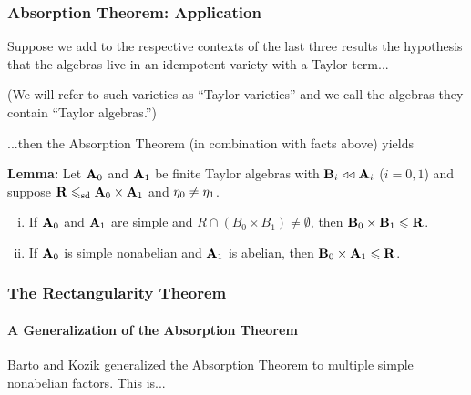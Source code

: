 \documentclass[9pt,xcolor=dvipsnames%
   ]{beamer}
\begin{document}
\begin{frame} \frametitle{Absorption Theorem: Application}
  Suppose we add to the respective contexts of the last three results the hypothesis
  that the algebras live in an idempotent variety with a Taylor term...

  \bigskip  
  (We will refer to such varieties as ``Taylor varieties'' and we call the
  algebras they contain ``Taylor algebras.'')

  \bigskip  
  ...then the Absorption Theorem (in combination with facts above) yields

  \bigskip  
  {\bf Lemma:}
  Let $\mathbf{A}_0$ and $\mathbf{A}_1$ be finite Taylor algebras
  with $\mathbf{B}_i\mathrel{\triangleleft\triangleleft} \mathbf{A}_i$ ($i =0,1$)
  and suppose $\mathbf{R} \leqslant_{\mathrm{sd}} \mathbf{A}_0 \times \mathbf{A}_1$ and $\eta_0 \neq \eta_1$.
    \begin{enumerate}[(i)]
    \item If $\mathbf{A}_0$ and $\mathbf{A}_1$ are simple and $R\cap (B_0 \times B_1) \neq \emptyset$, then
      $\mathbf{B}_0 \times \mathbf{B}_1\leqslant \mathbf{R}$. 
    \item  If $\mathbf{A}_0$ is simple nonabelian and $\mathbf{A}_1$ is abelian,
      then $\mathbf{B}_0 \times \mathbf{A}_1 \leqslant \mathbf{R}$.
    \end{enumerate}

    \bigskip

    \bigskip

    \bigskip
    
\end{frame}


\begin{frame} \frametitle{The Rectangularity Theorem}
  \framesubtitle{A Generalization of the Absorption Theorem}

  Barto and Kozik generalized the Absorption Theorem
  to multiple simple nonabelian factors. This is...
  \bigskip
\end{frame}
\end{document}
